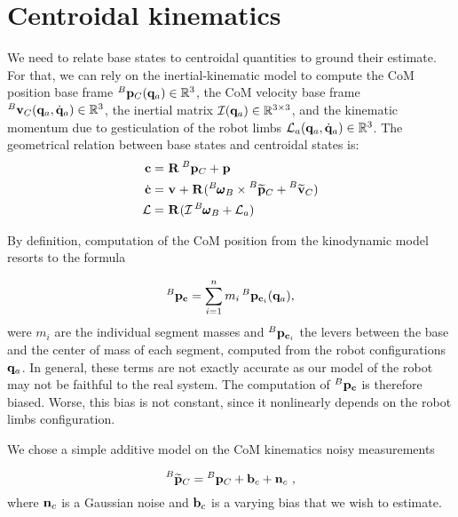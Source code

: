 \section{Centroidal kinematics}
\label{sec:centroidal_kinematics}
%
We need to relate base states to centroidal quantities to ground their estimate. 
For that, we can rely on the inertial-kinematic model to compute the CoM position \wrt base frame $\prescript{B}{}{{\bf p}}_{C}({\bf q}_a) \in \mathbb{R}^3$, the CoM velocity \wrt 
base frame $\prescript{B}{}{{\bf v}}_{C}({\bf q}_a, \dot{{\bf q}}_a) \in \mathbb{R}^3$, the inertial matrix $\mathcal{I}({\bf q}_a) \in \mathbb{R}^{3\times 3}$, and the kinematic momentum due to gesticulation 
of the robot limbs $\mathcal{L}_a({\bf q}_a, \dot{{\bf q}}_a) \in \mathbb{R}^{3}$. The geometrical relation between base states and centroidal states is:
%
\begin{equation}
    \begin{split}
    {\bf c} &= \prescript{}{}{{\bf R}}_{} \prescript{B}{}{{\bf p}}_{C} + \prescript{}{}{{\bf p}}_{}
    \\
    \dot{{\bf c}} &= 
    \prescript{}{}{{\bf v}}_{} + \prescript{}{}{{\bf R}}_{}(\prescript{B}{}{\pmb{\omega}}_{B} \times \prescript{B}{}{\widetilde{{\bf p}}}_{C} + \prescript{B}{}{\widetilde{{\bf v}}}_{C})
    \\
    \mathcal{L} &= \prescript{}{}{{\bf R}}_{}(\mathcal{I} \prescript{B}{}{\pmb{\omega}}_{B}+ \mathcal{L}_a)
    \end{split}
\end{equation}

By definition, computation of the CoM position from the kinodynamic model resorts to the formula

\begin{equation}
    \prescript{B}{}{{\bf p}}_{{\bf c}} = \sum_{i=1}^{n} m_i \prescript{B}{}{{\bf p}}_{{\bf c}_i}({\bf q}_a),
\end{equation}
%
were $m_i$ are the individual segment masses and $\prescript{B}{}{{\bf p}}_{{\bf c}_i}$ the levers between the base and the center of mass of each segment, computed from the robot configurations ${\bf q}_a$. In general, these terms are not exactly accurate as our model of the robot may not be faithful to the real system. The computation of $\prescript{B}{}{{\bf p}}_{{\bf c}}$ is therefore biased. Worse, this bias is not constant, since it nonlinearly depends on the robot limbs configuration. 

We chose a simple additive model on the CoM kinematics noisy measurements

\begin{equation}
    \prescript{B}{}{\widetilde{{\bf p}}}_{C} = \prescript{B}{}{{\bf p}}_{C} + {\bf b}_{c} + {\bf n}_c~,
    \label{eq:com_kine_meas}
\end{equation}
%
where ${\bf n}_c$ is a Gaussian noise and ${\bf b}_{c}$ is a varying bias that we wish to estimate.


